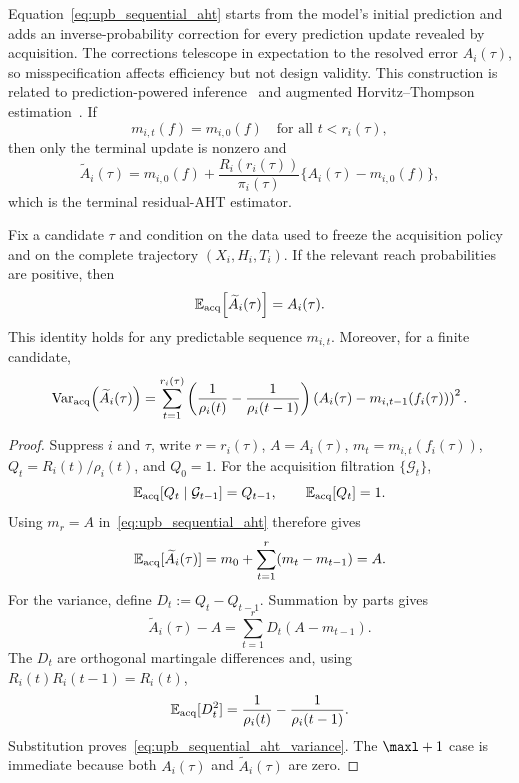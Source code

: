 Equation~\eqref{eq:upb_sequential_aht} starts from the model's initial
prediction and adds an inverse-probability correction for every prediction
update revealed by acquisition. The corrections telescope in expectation to
the resolved error $A_i(\tau)$, so misspecification affects efficiency but not
design validity. This construction is related to prediction-powered
inference~\citep{angelopoulos2023prediction} and augmented
Horvitz--Thompson estimation~\citep{Horvitz01121952,robins1994estimation,wang2001augmented}.
If
\begin{equation}
    m_{i,t}(f)=m_{i,0}(f)
    \quad\text{for all }t<r_i(\tau),
    \label{eq:upb_no_intermediate_updates}
\end{equation}
then only the terminal update is nonzero and
\begin{equation}
    \widetilde A_i(\tau)
    =m_{i,0}(f)
     +\frac{R_i(r_i(\tau))}{\pi_i(\tau)}
       \{A_i(\tau)-m_{i,0}(f)\},
    \label{eq:upb_terminal_residual_aht}
\end{equation}
which is the terminal residual-AHT estimator.

\begin{proposition}
\label{prop:valid_upb_weights}
Fix a candidate $\tau$ and condition on the data used to freeze the
acquisition policy and on the complete trajectory $(X_i,H_i,T_i)$. If the
relevant reach probabilities are positive, then
\begin{equation}
    \mathbb E_{\rm acq}\!\left[\widetilde A_i(\tau)\right]
    =A_i(\tau).
    \label{eq:valid_upb_weight_identity}
\end{equation}
This identity holds for any predictable sequence $m_{i,t}$. Moreover, for a
finite candidate,
\begin{equation}
    \operatorname{Var}_{\rm acq}\!\left(\widetilde A_i(\tau)\right)
    =\sum_{t=1}^{r_i(\tau)}
      \left(\frac{1}{\rho_i(t)}-\frac{1}{\rho_i(t-1)}\right)
      \left(A_i(\tau)-m_{i,t-1}(f_i(\tau))\right)^2.
    \label{eq:upb_sequential_aht_variance}
\end{equation}
\end{proposition}

\begin{proof}
Suppress $i$ and $\tau$, write $r=r_i(\tau)$, $A=A_i(\tau)$,
$m_t=m_{i,t}(f_i(\tau))$, $Q_t=R_i(t)/\rho_i(t)$, and $Q_0=1$.
For the acquisition filtration $\{\mathcal G_t\}$,
\[
    \mathbb E_{\rm acq}[Q_t\mid\mathcal G_{t-1}]=Q_{t-1},
    \qquad
    \mathbb E_{\rm acq}[Q_t]=1.
\]
Using $m_r=A$ in~\eqref{eq:upb_sequential_aht} therefore gives
\[
    \mathbb E_{\rm acq}[\widetilde A_i(\tau)]
    =m_0+\sum_{t=1}^{r}(m_t-m_{t-1})=A.
\]
For the variance, define $D_t:=Q_t-Q_{t-1}$. Summation by parts gives
\[
    \widetilde A_i(\tau)-A
    =\sum_{t=1}^{r}D_t(A-m_{t-1}).
\]
The $D_t$ are orthogonal martingale differences and, using
$R_i(t)R_i(t-1)=R_i(t)$,
\[
    \mathbb E_{\rm acq}[D_t^2]
    =\frac{1}{\rho_i(t)}-\frac{1}{\rho_i(t-1)}.
\]
Substitution proves~\eqref{eq:upb_sequential_aht_variance}. The
$\maxl+1$ case is immediate because both $A_i(\tau)$ and
$\widetilde A_i(\tau)$ are zero.
\end{proof}

